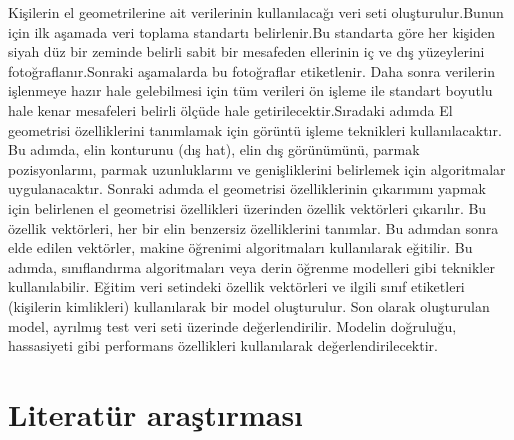 \documentclass[12pt, a4paper]{article}
\begin{document}
Kişilerin el geometrilerine ait verilerinin kullanılacağı veri seti oluşturulur.Bunun için ilk aşamada veri toplama standartı belirlenir.Bu standarta göre her kişiden siyah düz bir zeminde belirli sabit bir mesafeden ellerinin iç ve dış yüzeylerini fotoğraflanır.Sonraki aşamalarda bu fotoğraflar etiketlenir. Daha sonra verilerin işlenmeye hazır hale gelebilmesi için tüm verileri ön işleme ile standart boyutlu hale kenar mesafeleri belirli ölçüde hale getirilecektir.Sıradaki adımda El geometrisi özelliklerini tanımlamak için görüntü işleme teknikleri kullanılacaktır. Bu adımda, elin konturunu (dış hat), elin dış görünümünü, parmak pozisyonlarını, parmak uzunluklarını ve genişliklerini belirlemek için algoritmalar uygulanacaktır. Sonraki adımda el geometrisi özelliklerinin çıkarımını yapmak için belirlenen el geometrisi özellikleri üzerinden özellik vektörleri çıkarılır. Bu özellik vektörleri, her bir elin benzersiz özelliklerini tanımlar. Bu adımdan sonra elde edilen vektörler, makine öğrenimi algoritmaları kullanılarak eğitilir. Bu adımda, sınıflandırma algoritmaları veya derin öğrenme modelleri gibi teknikler kullanılabilir. Eğitim veri setindeki özellik vektörleri ve ilgili sınıf etiketleri (kişilerin kimlikleri) kullanılarak bir model oluşturulur. Son olarak oluşturulan model, ayrılmış test veri seti üzerinde değerlendirilir. Modelin doğruluğu, hassasiyeti gibi performans özellikleri kullanılarak değerlendirilecektir. 

\section{Literatür araştırması}
\end{document}
